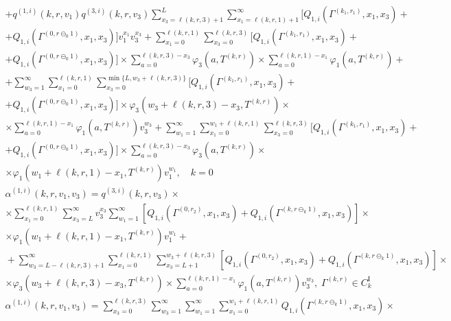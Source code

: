 \documentclass[60x84/16,10pt]{dccn}
\begin{document}
{\begin{gather*}
    +q^{(1,i)}(k,r,v_1) q^{(3,i)}(k,r,v_3)\sum_{x_3=\ell(k,r,3)+1}^{L} \sum_{x_1=\ell(k,r,1)+1}^{\infty}    [  Q_{1,i}(\Gamma^{(k_1, r_1)},x_1, x_3) +\\
    +Q_{1,i}(\Gamma^{(0, r\ominus_0 1)},x_1, x_3)] v_1^{x_1} v_3^{ x_3} 
    +  \sum_{x_1=0}^{\ell(k,r,1)} \sum_{x_3=0}^{\ell(k,r,3)} [  Q_{1,i}(\Gamma^{(k_1, r_1)},x_1, x_3) +\\
    +Q_{1,i}(\Gamma^{(0, r\ominus_0 1)},x_1, x_3)]\times
\sum_{a=0}^{\ell(k,r,3)-x_3}\varphi_3(a,T^{(k,r)}) \times \sum_{a=0}^{\ell(k,r,1)-x_1}\varphi_1(a,T^{(k,r)})
+ \\ +
    \sum_{w_3=1}^{\infty} \sum_{x_1=0}^{\ell(k,r,1)} \sum_{x_3=0}^{\min{\{L, w_3 + \ell(k,r,3)\}}} [  Q_{1,i}(\Gamma^{(k_1, r_1)},x_1, x_3) +\\
    +Q_{1,i}(\Gamma^{(0, r\ominus_0 1)},x_1, x_3)] \times \varphi_3(w_3 + \ell(k,r,3) - x_3,T^{(k,r)})  \times\\ \times \sum_{a=0}^{\ell(k,r,1)-x_1}\varphi_1(a,T^{(k,r)})  v_3^{w_3}
    +
     \sum_{w_1=1}^{\infty} \sum_{x_1=0}^{w_1 + \ell(k,r,1) } \sum_{x_3=0}^{\ell(k,r,3)} [  Q_{1,i}(\Gamma^{(k_1, r_1)},x_1, x_3) +\\
    +Q_{1,i}(\Gamma^{(0, r\ominus_0 1)},x_1, x_3)] \times \sum_{a=0}^{\ell(k,r,3)-x_3}\varphi_3(a,T^{(k,r)}) \times\\ \times \varphi_1(w_1 + \ell(k,r,1) - x_1,T^{(k,r)}) v_1^{w_1} 
    , \quad k = 0    
\\
\alpha^{(1,i)}(k,r,v_1,v_3) = 
     q^{(3,i)}(k,r,v_3) \times\\
    \times  \sum_{x_1=0}^{\ell(k,r,1)}\sum_{x_3=L}^{\infty}  v_3^{x_3} \sum_{w_1=1}^{\infty} [Q_{1,i}(\Gamma^{(0,r_2)},x_1, x_3)+Q_{1,i}(\Gamma^{(k,r\ominus_k 1)},x_1, x_3)]\times \\ \times \varphi_1(w_1 + \ell(k,r,1) - x_1,T^{(k,r)})v_1^{w_1} + \\
   \!+\!\!
    \sum_{w_3=L -\ell(k,r,3) + 1}^{\infty}\!\! \sum_{x_1=0}^{\ell(k,r,1)}
    \sum_{x_3=L+1}^{w_3 + \ell(k,r,3)}\!\!\!\!\![Q_{1,i}(\Gamma^{(0,r_2)}\!,x_1,
    x_3)\!+\!Q_{1,i}(\Gamma^{(k,r\ominus_k 1)}\!,x_1, x_3)] \!\times  \\ 
    \times \varphi_3(w_3 + \ell(k,r,3) - x_3,T^{(k,r)})  \times \sum_{a=0}^{\ell(k,r,1)-x_1}\varphi_1(a,T^{(k,r)})  v_3^{w_3} 
     , \; \Gamma^{(k,r)} \in C_{k}^{\mathrm{I}} 
\\
\alpha^{(1,i)}(k,r,v_1,v_3) = 
    \sum_{x_3=0}^{\ell(k,r,3)}\sum_{w_3=1}^{\infty} \sum_{w_1=1}^{\infty} \sum_{x_1=0}^{w_1+\ell(k,r,1)}  Q_{1,i}(\Gamma^{(k,r\ominus_k 1)},x_1, x_3) \times  \\

\end{gather*}}
\end{document}
